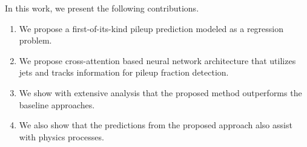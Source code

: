 
In this work, we present the following contributions.
\begin{enumerate}
    \item We propose a first-of-its-kind pileup prediction modeled as a regression problem.
    \item We propose cross-attention based neural network architecture that utilizes jets and tracks information for pileup fraction detection.
    \item We show with extensive analysis that the proposed method outperforms the baseline approaches.
    \item We also show that the predictions from the proposed approach also assist with physics processes.
\end{enumerate}






